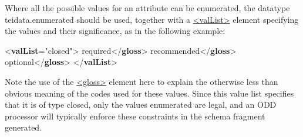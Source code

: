 Where all the possible values for an attribute can be enumerated, the datatype \textsf{teidata.enumerated} should be used, together with a \hyperref[TEI.valList]{<valList>} element specifying the values and their significance, as in the following example: \par\bgroup{}\exampleFont \begin{shaded}\noindent\mbox{}{<\textbf{valList}\hspace*{1em}{type}="{closed}">}\mbox{}\newline 
{}\mbox{}\newline 
\hspace*{1em}required{</\textbf{gloss}>}\mbox{}\newline 
{}\mbox{}\newline 
{}\mbox{}\newline 
\hspace*{1em}recommended{</\textbf{gloss}>}\mbox{}\newline 
{}\mbox{}\newline 
{}\mbox{}\newline 
\hspace*{1em}optional{</\textbf{gloss}>}\mbox{}\newline 
{}\mbox{}\newline 
{</\textbf{valList}>}\end{shaded}\egroup\par \noindent  Note the use of the \hyperref[TEI.gloss]{<gloss>} element here to explain the otherwise less than obvious meaning of the codes used for these values. Since this value list specifies that it is of type closed, only the values enumerated are legal, and an ODD processor will typically enforce these constraints in the schema fragment generated.\par
